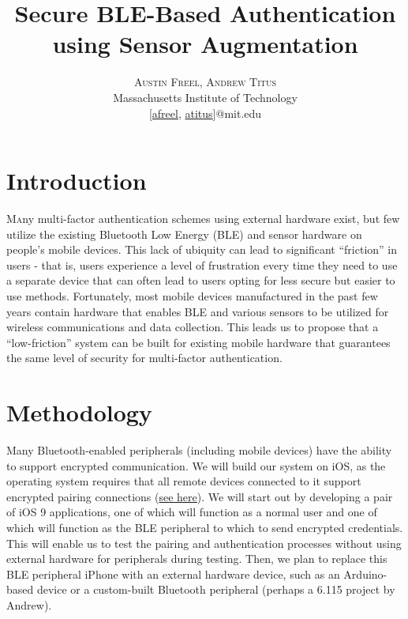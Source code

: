 \documentclass[twoside]{article}
\title{\vspace{-15mm}\fontsize{24pt}{10pt}\selectfont\textbf{Secure BLE-Based Authentication using Sensor Augmentation}}
\author{
\large
\textsc{Austin Freel, Andrew Titus}\\[2mm] %
\normalsize Massachusetts Institute of Technology \\ %
\normalsize [\href{mailto:afreel@mit.edu}{afreel}, \href{mailto:atitus@mit.edu}{atitus}]@mit.edu %
\vspace{-5mm}
}
\date{}
\begin{document}
\maketitle %

\thispagestyle{fancy} %


\begin{multicols}{2} %

\section{Introduction}

\lettrine[nindent=0em,lines=3]{M}any multi-factor authentication schemes using external
hardware exist, but few utilize the existing Bluetooth Low Energy (BLE) and sensor hardware
on people's mobile devices. This lack of ubiquity can lead to significant ``friction'' in
users - that is, users experience a level of frustration every time they need to use a
separate device that can often lead to users opting for less secure but easier to use methods.
Fortunately, most mobile devices manufactured in the past few years contain hardware that
enables BLE and various sensors to be utilized for wireless communications and data collection.
This leads us to propose that a ``low-friction'' system can be built for existing mobile
hardware that guarantees the same level of security for multi-factor authentication.


\section{Methodology}

Many Bluetooth-enabled peripherals (including mobile devices) have the ability to support
encrypted communication. We will build our system on iOS, as the operating system requires
that all remote devices connected to it support encrypted pairing connections
(\href{https://support.apple.com/en-us/HT204387}{see here}). We will start out by developing
a pair of iOS 9 applications, one of which will function as a normal user and one of which will function
as the BLE peripheral to which to send encrypted credentials. This will enable us to test
the pairing and authentication processes without using external hardware for peripherals
during testing. Then, we plan to replace this BLE peripheral iPhone with an external
hardware device, such as an Arduino-based device or a custom-built Bluetooth peripheral (perhaps
a 6.115 project by Andrew).


\end{multicols}
\end{document}

